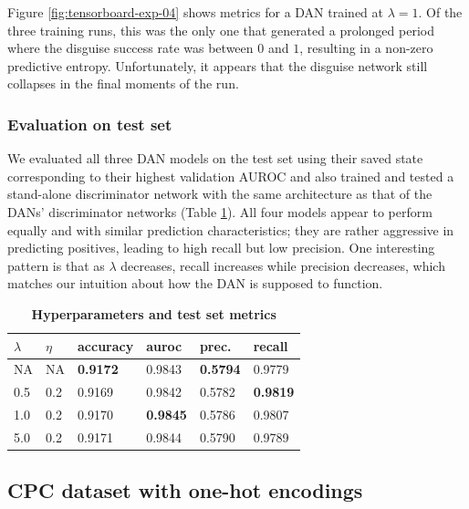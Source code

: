 \documentclass{proc}
\begin{document}
Figure \ref{fig:tensorboard-exp-04} shows metrics for a DAN trained at $\lambda = 1$. Of the three training runs, this was the only one that generated a prolonged period where the disguise success rate was between $0$ and $1$, resulting in a non-zero predictive entropy. Unfortunately, it appears that the disguise network still collapses in the final moments of the run.

\subsubsection{Evaluation on test set}

We evaluated all three DAN models on the test set using their saved state corresponding to their highest validation AUROC and also trained and tested a stand-alone discriminator network with the same architecture as that of the DANs' discriminator networks (Table \ref{table:cpc-embeddings-test}). All four models appear to perform equally and with similar prediction characteristics; they are rather aggressive in predicting positives, leading to high recall but low precision. One interesting pattern is that as $\lambda$ decreases, recall increases while precision decreases, which matches our intuition about how the DAN is supposed to function.

\begin{table}[]
\begin{center}
	\begin{tabular}{|l|l|l|l|l|l|}
		\hline
 		\textbf{$\lambda$} & \textbf{$\eta$} & accuracy & auroc & prec. & recall \\ \hline
 		NA & NA & \textbf{0.9172} & 0.9843 & \textbf{0.5794} & 0.9779 \\ \hline
 		0.5 & 0.2 & 0.9169 & 0.9842 & 0.5782 & \textbf{0.9819} \\ \hline
 		1.0 & 0.2 & 0.9170 & \textbf{0.9845} & 0.5786 & 0.9807 \\ \hline
 		5.0 & 0.2 & 0.9171 & 0.9844 & 0.5790 & 0.9789 \\ \hline
	\end{tabular}
	\caption{\textbf{Hyperparameters and test set metrics}}
	\label{table:cpc-embeddings-test}
\end{center}
\end{table}

\subsection{CPC dataset with one-hot encodings}
\end{document}
